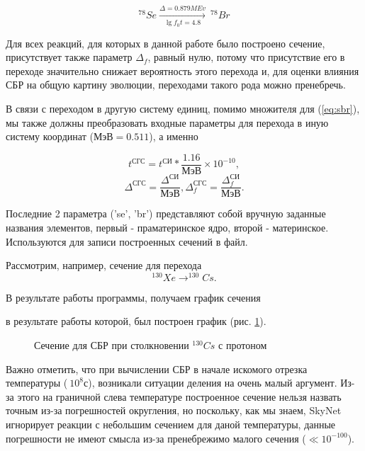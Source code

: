 \documentclass[%
master,    %
natbib,      %
subf,        %
href,        %
colorlinks,  %
]{disser}
\begin{document}
\begin{equation}
\label{eq:transform-1}
^{78}Se \xrightarrow[\lg f_0 t = 4.8]{\Delta = 0.879 MEv}  \ ^{78}Br
\end{equation}

Для всех реакций, для которых в данной работе было построено сечение, присутствует также параметр $\Delta_f$, равный нулю, потому что присутствие его в переходе значительно снижает вероятность этого перехода и, для оценки влияния СБР на общую картину эволюции, переходами такого рода можно пренебречь.

В связи с переходом в другую систему единиц, помимо множителя для (\ref{eq:sbr}),  мы также должны преобразовать входные параметры для перехода в иную систему координат ($\text{МэВ} = 0.511$), а именно

$$
t^{\text{СГС}} = t^{\text{СИ}} * \frac{1.16}{\text{МэВ}} \times 10^{-10},
$$
$$
\Delta^{\text{СГС}} = \frac{\Delta^{\text{СИ}}}{\text{МэВ}}, \Delta_f^{\text{СГС}} = \frac{\Delta_f^{\text{СИ}}}{\text{МэВ}}.
$$

Последние 2 параметра ('se', 'br') представляют собой вручную заданные названия элементов, первый - праматеринское ядро, второй - материнское. Используются для записи построенных сечений в файл. 

Рассмотрим, например, сечение для перехода 
$$^{130}Xe \to ^{130}Cs.$$

В результате работы программы, получаем график сечения

в результате работы которой, был построен график (рис. \ref{ris:1}).
\begin{figure}
	\caption{Сечение для СБР при столкновении $^{130}Cs$ с протоном}
	\label{ris:1}
\end{figure}

Важно отметить, что при вычислении СБР в начале искомого отрезка температуры ($~10^8\text{с}$), возникали ситуации деления на очень малый аргумент. Из-за этого на граничной слева температуре построенное сечение нельзя назвать точным из-за погрешностей округления, но поскольку, как мы знаем, SkyNet игнорирует реакции с небольшим сечением для даной температуры, данные погрешности не имеют смысла из-за пренебрежимо малого сечения ($\ll 10^{-100}$).
\end{document}
